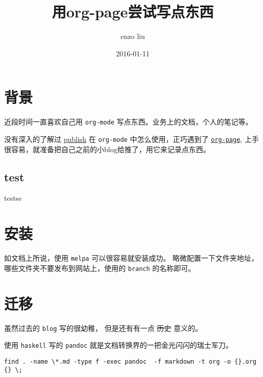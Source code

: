 \documentclass[presentation]{beamer}
\author{enzo liu}
\date{2016-01-11}
\title{用org-page尝试写点东西}
\begin{document}
\maketitle

\section*{背景}
\label{sec:orgheadline1}

近段时间一直喜欢自己用 \texttt{org-mode} 写点东西。业务上的文档，个人的笔记等。

没有深入的了解过 \uline{publish} 在 \texttt{org-mode} 中怎么使用，正巧遇到了 \href{https://github.com/kelvinh/org-page}{\texttt{org-page}}, 上手很容易，就准备把自己之前的小blog给推了，用它来记录点东西。

\subsection*{test}
\label{sec:orgheadline1}

testse

\section*{安装}
\label{sec:orgheadline1}

如文档上所说，使用 \texttt{melpa} 可以很容易就安装成功。 略微配置一下文件夹地址，哪些文件夹不要发布到网站上，使用的 \texttt{branch} 的名称即可。

\section*{迁移}
\label{sec:orgheadline1}

虽然过去的 \texttt{blog} 写的很幼稚， 但是还有有一点 \sout{历史} 意义的。

使用 \texttt{haskell} 写的 \texttt{pandoc} 就是文档转换界的一把金光闪闪的瑞士军刀。

\begin{lstlisting}
find . -name \*.md -type f -exec pandoc  -f markdown -t org -o {}.org {} \;
\end{lstlisting}
\end{document}
